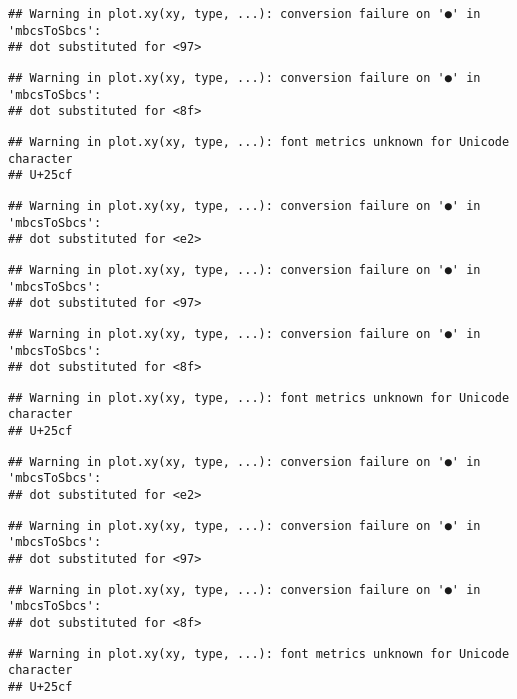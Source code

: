 \documentclass[
]{article}
\begin{document}
\begin{verbatim}
## Warning in plot.xy(xy, type, ...): conversion failure on '●' in 'mbcsToSbcs':
## dot substituted for <97>
\end{verbatim}

\begin{verbatim}
## Warning in plot.xy(xy, type, ...): conversion failure on '●' in 'mbcsToSbcs':
## dot substituted for <8f>
\end{verbatim}

\begin{verbatim}
## Warning in plot.xy(xy, type, ...): font metrics unknown for Unicode character
## U+25cf
\end{verbatim}

\begin{verbatim}
## Warning in plot.xy(xy, type, ...): conversion failure on '●' in 'mbcsToSbcs':
## dot substituted for <e2>
\end{verbatim}

\begin{verbatim}
## Warning in plot.xy(xy, type, ...): conversion failure on '●' in 'mbcsToSbcs':
## dot substituted for <97>
\end{verbatim}

\begin{verbatim}
## Warning in plot.xy(xy, type, ...): conversion failure on '●' in 'mbcsToSbcs':
## dot substituted for <8f>
\end{verbatim}

\begin{verbatim}
## Warning in plot.xy(xy, type, ...): font metrics unknown for Unicode character
## U+25cf
\end{verbatim}

\begin{verbatim}
## Warning in plot.xy(xy, type, ...): conversion failure on '●' in 'mbcsToSbcs':
## dot substituted for <e2>
\end{verbatim}

\begin{verbatim}
## Warning in plot.xy(xy, type, ...): conversion failure on '●' in 'mbcsToSbcs':
## dot substituted for <97>
\end{verbatim}

\begin{verbatim}
## Warning in plot.xy(xy, type, ...): conversion failure on '●' in 'mbcsToSbcs':
## dot substituted for <8f>
\end{verbatim}

\begin{verbatim}
## Warning in plot.xy(xy, type, ...): font metrics unknown for Unicode character
## U+25cf
\end{verbatim}
\end{document}
